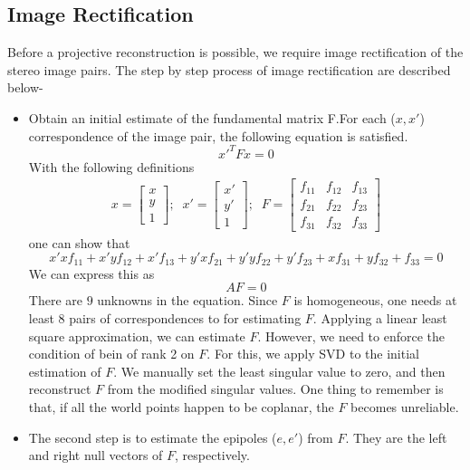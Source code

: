 \documentclass{article}
\begin{document}
\subsection{Image Rectification}
\label{subsec:IR}
Before a projective reconstruction is possible,  we require image rectification of the stereo image pairs. The step by step process of image rectification are described below-
\begin{itemize}
\item Obtain an initial estimate of the fundamental matrix F.For each ($x, x'$) correspondence of the image pair, the following equation is satisfied.
\begin{equation}
	x'^{T}Fx = 0
\end{equation}
With the following definitions
\begin{eqnarray}
	x = \begin{bmatrix}
		x \\ y \\1
	\end{bmatrix};\;\;
	x' = \begin{bmatrix}
	x' \\y' \\1
	\end{bmatrix};\;\;
	F = \begin{bmatrix}
	f_{11} & f_{12} & f_{13}\\ f_{21} & f_{22} & f_{23} \\ f_{31} & f_{32} & f_{33}	
	\end{bmatrix}	
\end{eqnarray}
one can show that
\begin{equation}
x'xf_{11} + x'yf_{12} + x'f_{13} + y'xf_{21} + y'yf_{22} + y'f_{23} + xf_{31} + yf_{32} + f_{33} = 0
\end{equation}
We can express this as 
\begin{equation}
AF = 0
\end{equation}
There are $9$ unknowns in the equation. Since $F$ is homogeneous, one needs at least $8$ pairs of correspondences to for estimating $F$. Applying a linear least square approximation, we can estimate $F$. However, we need to enforce the condition of bein of rank 2 on $F$. For this, we apply SVD to the initial estimation of $F$. We manually set the least singular value to zero, and then reconstruct $F$ from the modified singular values.  One thing to remember is that, if all the world points happen to be coplanar, the $F$ becomes unreliable.
\item The second step is to estimate the epipoles ($e, e'$) from $F$. They are the left and right null vectors of $F$, respectively.

\end{itemize}
\end{document}
